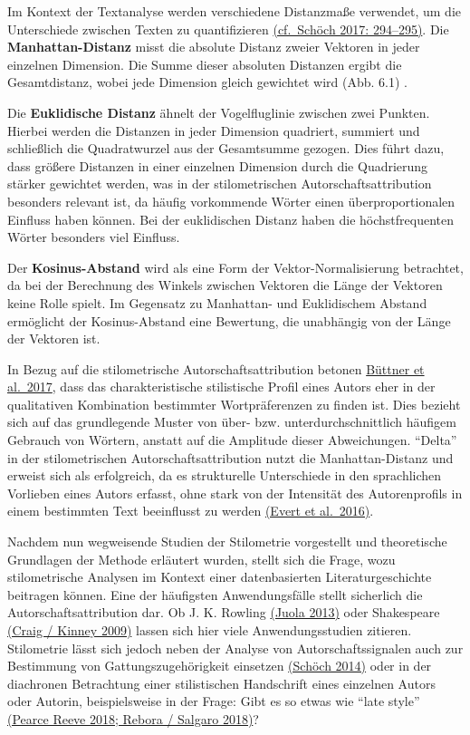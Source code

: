 \documentclass[
  letterpaper,
  DIV=11,
  numbers=noendperiod]{scrreprt}
\begin{document}
Im Kontext der Textanalyse werden verschiedene Distanzmaße verwendet, um
die Unterschiede zwischen Texten zu quantifizieren
\href{https://www.zotero.org/google-docs/?broken=kg8XTk}{(cf.~Schöch
2017: 294--295)}. Die \textbf{Manhattan-Distanz} misst die absolute
Distanz zweier Vektoren in jeder einzelnen Dimension. Die Summe dieser
absoluten Distanzen ergibt die Gesamtdistanz, wobei jede Dimension
gleich gewichtet wird (Abb. 6.1) .

Die \textbf{Euklidische Distanz} ähnelt der Vogelfluglinie zwischen zwei
Punkten. Hierbei werden die Distanzen in jeder Dimension quadriert,
summiert und schließlich die Quadratwurzel aus der Gesamtsumme gezogen.
Dies führt dazu, dass größere Distanzen in einer einzelnen Dimension
durch die Quadrierung stärker gewichtet werden, was in der
stilometrischen Autorschaftsattribution besonders relevant ist, da
häufig vorkommende Wörter einen überproportionalen Einfluss haben
können. Bei der euklidischen Distanz haben die höchstfrequenten Wörter
besonders viel Einfluss.

Der \textbf{Kosinus-Abstand} wird als eine Form der
Vektor-Normalisierung betrachtet, da bei der Berechnung des Winkels
zwischen Vektoren die Länge der Vektoren keine Rolle spielt. Im
Gegensatz zu Manhattan- und Euklidischem Abstand ermöglicht der
Kosinus-Abstand eine Bewertung, die unabhängig von der Länge der
Vektoren ist.

In Bezug auf die stilometrische Autorschaftsattribution betonen
\href{https://www.zotero.org/google-docs/?k31SAF}{Büttner et al.~2017},
dass das charakteristische stilistische Profil eines Autors eher in der
qualitativen Kombination bestimmter Wortpräferenzen zu finden ist. Dies
bezieht sich auf das grundlegende Muster von über- bzw.
unterdurchschnittlich häufigem Gebrauch von Wörtern, anstatt auf die
Amplitude dieser Abweichungen. ``Delta'' in der stilometrischen
Autorschaftsattribution nutzt die Manhattan-Distanz und erweist sich als
erfolgreich, da es strukturelle Unterschiede in den sprachlichen
Vorlieben eines Autors erfasst, ohne stark von der Intensität des
Autorenprofils in einem bestimmten Text beeinflusst zu werden
\href{https://www.zotero.org/google-docs/?O9h98g}{(Evert et al.~2016)}.

Nachdem nun wegweisende Studien der Stilometrie vorgestellt und
theoretische Grundlagen der Methode erläutert wurden, stellt sich die
Frage, wozu stilometrische Analysen im Kontext einer datenbasierten
Literaturgeschichte beitragen können. Eine der häufigsten
Anwendungsfälle stellt sicherlich die Autorschaftsattribution dar. Ob J.
K. Rowling \href{https://www.zotero.org/google-docs/?R83fLa}{(Juola
2013)} oder Shakespeare
\href{https://www.zotero.org/google-docs/?DuYc0j}{(Craig / Kinney 2009)}
lassen sich hier viele Anwendungsstudien zitieren.\\
Stilometrie lässt sich jedoch neben der Analyse von Autorschaftssignalen
auch zur Bestimmung von Gattungszugehörigkeit einsetzen
\href{https://www.zotero.org/google-docs/?spXJZp}{(Schöch 2014)} oder in
der diachronen Betrachtung einer stilistischen Handschrift eines
einzelnen Autors oder Autorin, beispielsweise in der Frage: Gibt es so
etwas wie ``late style''
\href{https://www.zotero.org/google-docs/?JFpMMD}{(Pearce Reeve 2018;
Rebora / Salgaro 2018)}?
\end{document}
